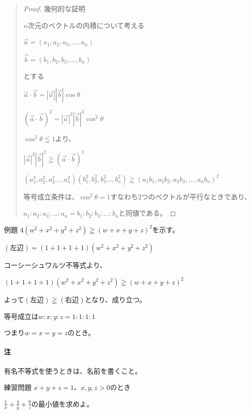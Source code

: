 \documentclass[uplatex,fleqn]{jsbook}
\begin{document}
\begin{quote}
    \begin{proof}
        幾何的な証明

        $n$次元のベクトルの内積について考える

        $\vec{a}=\left(a_1,a_2,a_3,\dots,a_n\right)$

        $\vec{b}=\left(b_1,b_2,b_3,\dots,b_n\right)$

        とする

        $\vec{a}\cdot\vec{b}=|\vec{a}||\vec{b}|\cos\theta$

        $\left(\vec{a}\cdot\vec{b}\right)^2=|\vec{a}|^2|\vec{b}|^2\cos^2\theta$

        $\cos^2\theta\leqq1$より、

        $|\vec{a}|^2|\vec{b}|^2\geqq\left(\vec{a}\cdot\vec{b}\right)^2$

        $\left(a^2_1,a^2_2,a^2_3\dots,a^2_n\right)\left(b^2_1,b^2_2,b^2_3\dots,b^2_n\right)\geqq\left(a_1b_1,a_2b_2,a_3b_3,\dots,a_nb_n\right)^2$

        等号成立条件は、$\cos^2\theta=1$すなわち2つのベクトルが平行なときであり、

        $a_1:a_2:a_3:\dots:a_n=b_1:b_2:b_3:\dots:b_n$と同値である。
    \end{proof}
\end{quote}

\begin{problem}{例題}
    $4\left(w^2+x^2+y^2+z^2\right)\geqq \left(w+x+y+z\right)^2$を示す。

    $\left(\text{左辺}\right)=\left(1+1+1+1\right)\left(w^2+x^2+y^2+z^2\right)$

    コーシーシュワルツ不等式より、

    $\left(1+1+1+1\right)\left(w^2+x^2+y^2+z^2\right)\geqq \left(w+x+y+z\right)^2$

    よって$\left(\text{左辺}\right)\geqq \left(右辺\right)$となり、成り立つ。

    等号成立は$w:x:y:z=1:1:1:1$

    つまり$w=x=y=z$のとき。
\end{problem}

\paragraph{注}有名不等式を使うときは、名前を書くこと。

\begin{problem}{練習問題}
    $x+y+z=1$、$x,y,z>0$のとき

    $\displaystyle \frac{1}{x}+\frac{4}{y}+\frac{9}{z}$の最小値を求めよ。
\end{problem}
\end{document}
